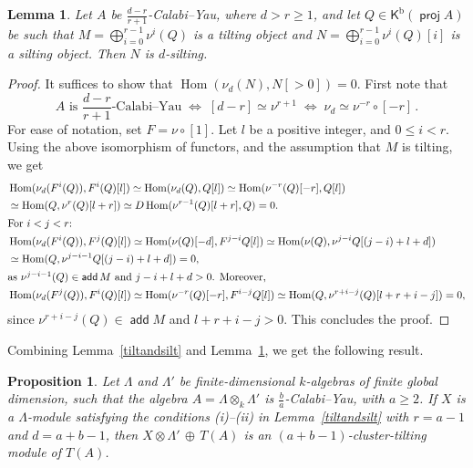 \documentclass[a4paper,reqno,11pt]{amsart}
\newtheorem{lemma}[theorem]{Lemma}
\newtheorem{proposition}[theorem]{Proposition}
\theoremstyle{definition}
\newcommand{\KKK}{\mathsf{K}}
\newcommand{\TT}{\mathcal{T}}
\newcommand{\bo}{\operatorname{b}\nolimits}
\newcommand{\Hom}{\operatorname{Hom}\nolimits}
\DeclareMathOperator{\proj}{\mathsf{proj}}
\DeclareMathOperator{\add}{\mathsf{add}}
\numberwithin{equation}{section}
\begin{document}
\begin{lemma} \label{CYcot}
  Let $A$ be $\frac{d-r}{r+1}$-Calabi--Yau, where $d>r\ge1$, and let $Q\in\KKK^{\bo}(\proj A)$ be such that $M= \bigoplus_{i=0}^{r-1} \nu^i(Q)$ is a tilting object and
  $N = \bigoplus_{i=0}^{r-1} \nu^i(Q)[i]$ is a silting object.
  Then $N$ is $d$-silting.
\end{lemma}

\begin{proof}
It suffices to show that $\Hom(\nu_d(N),N[>0])=0$.
First note that
\[\mbox{$A$ is $\frac{d-r}{r+1}$-Calabi--Yau} \;\Leftrightarrow\; [d-r]\simeq \nu^{r+1} \;\Leftrightarrow\; \nu_d \simeq \nu^{-r}\circ[-r] \,. \]
For ease of notation, set $F = \nu\circ[1]$. 
Let $l$ be a positive integer, and $0\le i<r$. Using the above isomorphism of functors, and the assumption that $M$ is tilting, we get
\begin{align*}
  &\Hom(\nu_d(F^i(Q)),F^i(Q)[l]) \simeq \Hom(\nu_d(Q),Q[l]) 
  \simeq \Hom(\nu^{-r}(Q)[-r],Q[l]) \\
  &\simeq \Hom(Q,\nu^r(Q)[l+r]) \simeq D\Hom(\nu^{r-1}(Q)[l+r], Q) = 0. \\
\intertext{For $i<j<r$:}
  &\Hom(\nu_d(F^i(Q)),F^j(Q)[l]) \simeq \Hom(\nu(Q)[-d],F^{j-i}Q[l])\simeq \Hom(\nu(Q),\nu^{j-i}Q[(j-i)+l+d]) \\
  &\simeq \Hom(Q,\nu^{j-i-1}Q[(j-i)+l+d]) = 0, \\
  \intertext{as $\nu^{j-i-1}(Q)\in\add M$ and $j-i+l+d>0$. Moreover,}
  &\Hom(\nu_d(F^j(Q)), F^i(Q)[l]) \simeq \Hom(\nu^{-r}(Q)[-r], F^{i-j}Q[l]) \simeq \Hom(Q, \nu^{r+i-j}(Q)[l+r+i-j]) =0,
\end{align*}
since $\nu^{r+i-j}(Q)\in \add M$ and $l+r+i-j>0$. This concludes the proof.
\end{proof}


Combining Lemma~\ref{tiltandsilt} and Lemma~\ref{CYcot}, we get the following result.

\begin{proposition} \label{CYsiltCT}
  Let $\Lambda$ and $\Lambda'$ be finite-dimensional $k$-algebras of finite global dimension, such that the algebra $A=\Lambda\otimes_k\Lambda'$ is $\frac{b}{a}$-Calabi--Yau, with $a\ge2$.
  If $X$ is a $\Lambda$-module satisfying the conditions (i)--(ii) in Lemma~\ref{tiltandsilt} with $r = a-1$ and $d = a+b-1$, then
  $X\otimes\Lambda' \,\oplus\, T(A)$ is an $(a+b-1)$-cluster-tilting module of $T(A)$.
\end{proposition}
\end{document}
